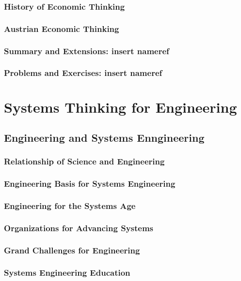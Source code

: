 \documentclass[11pt,fleqn]{book} %
\begin{document}
    \section{History of Economic Thinking}
    \section{Austrian Economic Thinking}
    \section{Summary and Extensions: insert nameref}
    \section{Problems and Exercises: insert nameref}

\part{Systems Thinking for Engineering}

  \chapter{Engineering and Systems Enngineering}
    \section{Relationship of Science and Engineering}
    \section{Engineering Basis for Systems Engineering}
    \section{Engineering for the Systems Age}
    \section{Organizations for Advancing Systems}
    \section{Grand Challenges for Engineering}
    \section{Systems Engineering Education}
\end{document}
